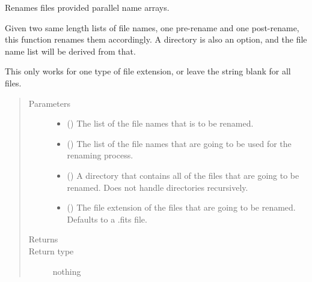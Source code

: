 \documentclass[letterpaper,10pt,english]{sphinxmanual}
\begin{document}
\begin{fulllineitems}
\label{\detokenize{python_docstrings/IfA_Smeargle.bravo.renaming:IfA_Smeargle.bravo.renaming.parallel_renaming}}
Renames files provided parallel name arrays.

Given two same length lists of file names, one pre-rename and one
post-rename, this function renames them accordingly. A directory is also
an option, and the file name list will be derived from that.

This only works for one type of file extension, or leave the string blank
for all files.
\begin{quote}\begin{description}
\item[{Parameters}] \leavevmode\begin{itemize}
\item {} 
 () \textendash{} The list of the file names that is to be renamed.

\item {} 
 () \textendash{} The list of the file names that are going to be used for the renaming
process.

\item {} 
 (\sphinxstyleliteralemphasis{\sphinxupquote{ (}}\sphinxstyleliteralemphasis{\sphinxupquote{)}}) \textendash{} A directory that contains all of the files that are going to be
renamed. Does not handle directories recursively.

\item {} 
 (\sphinxstyleliteralemphasis{\sphinxupquote{ (}}\sphinxstyleliteralemphasis{\sphinxupquote{)}}) \textendash{} The file extension of the files that are going to be renamed. Defaults
to a .fits file.

\end{itemize}

\item[{Returns}] \leavevmode


\item[{Return type}] \leavevmode
nothing

\end{description}\end{quote}

\end{fulllineitems}
\end{document}
